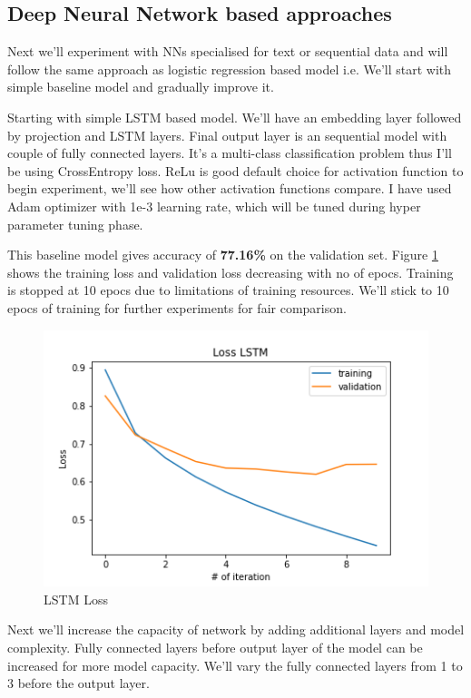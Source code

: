 \documentclass[10pt,a4paper]{article}
\begin{document}
\subsection{Deep Neural Network based approaches}

Next we'll experiment with NNs specialised for text or sequential data and will follow the same approach as logistic regression based model i.e. We'll start with simple baseline model and gradually improve it.

Starting with simple LSTM based model. We'll have an embedding layer followed by projection and LSTM layers. Final output layer is an sequential model with couple of fully connected layers. It's a multi-class classification problem thus I'll be using CrossEntropy loss. ReLu is good default choice for activation function to begin experiment, we'll see how other activation functions compare. I have used Adam optimizer with 1e-3 learning rate, which will be tuned during hyper parameter tuning phase.

	This baseline model gives accuracy of \textbf{77.16\%} on the validation set. Figure \ref{nnloss} shows the training loss and validation loss decreasing with no of epocs. Training is stopped at 10 epocs due to limitations of training resources. We'll stick to 10 epocs of training for further experiments for fair comparison. \\

\begin{figure}[h!]
\begin{center}
	\includegraphics[width=0.85\linewidth]{loss_lstm.png}
	\caption{LSTM Loss}
	\label{nnloss}
\end{center}
\end{figure}


	Next we'll increase the capacity of network by adding additional layers and model complexity. Fully connected layers before output layer of the model can be increased for more model capacity. We'll vary the fully connected layers from 1 to 3 before the output layer. \\
	
\end{document}
